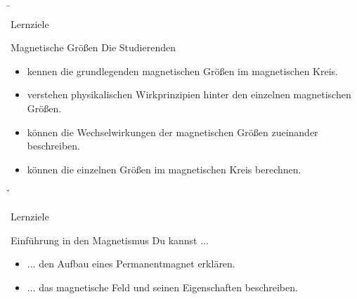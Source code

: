 \b{
	\begin{frame}{Lernziele}
		\begin{Lernziele}{Magnetische Größen}
			Die Studierenden
			\begin{itemize}
				\item kennen die grundlegenden magnetischen Größen im magnetischen Kreis.
				\item verstehen physikalischen Wirkprinzipien hinter den einzelnen magnetischen Größen.
				\item können die Wechselwirkungen der magnetischen Größen zueinander beschreiben.
				\item können die einzelnen Größen im magnetischen Kreis berechnen.
			\end{itemize}
		\end{Lernziele}
	\end{frame}
}
\v{
	\begin{frame}{Lernziele}
		\begin{Lernziele}{Einführung in den Magnetismus}
			Du kannst ...
			\begin{itemize}
				\item ... den Aufbau eines Permanentmagnet erklären.
				\item ... das magnetische Feld und seinen Eigenschaften beschreiben.
			\end{itemize}
		\end{Lernziele}
	\end{frame}
}

